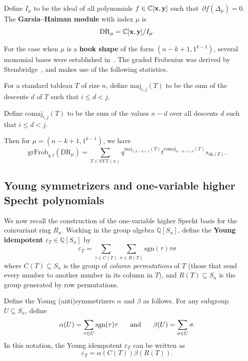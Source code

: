 \documentclass[ALCO,Unicode]{cedram}
\newcommand{\SYT}{\mathrm{SYT}}
\newcommand{\sh}{\mathrm{sh}}
\newcommand{\sgn}{\mathrm{sgn}}
\newcommand{\maj}{\mathrm{maj}}
\newcommand{\comaj}{\mathrm{comaj}}
\newcommand{\DR}{\mathrm{DR}}
\newcommand{\CC}{\mathbb{C}}
\newcommand{\QQ}{\mathbb{Q}}
\newcommand{\grFrob}{\mathrm{grFrob}}
\begin{document}
\begin{definition}
	Define $I_\mu$ to be the ideal of all polynomials $f\in \mathbb{C}[{\bf x},{\bf y}]$ such that~$\partial f(\Delta_\mu)=0$.  The \textbf{Garsia--Haiman module} with index $\mu$ is $$\DR_\mu =\CC[{\bf x},{\bf y}]/I_\mu.$$
\end{definition}

For the case when $\mu$ is a \textbf{hook shape} of the form $(n-k+1,1^{k-1})$, several monomial bases were established in~\cite{HookBases}.  The graded Frobenius was derived by Stembridge~\cite{Stembridge}, and makes use of the following statistics.

\begin{definition}\label{def:maj-comaj}
	For a standard tableau $T$ of size $n$, define $\maj_{i,j}(T)$ to be the sum of the descents $d$ of $T$ such that $i\le d<j$.
	
	Define $\comaj_{i,j}(T)$ to be the sum of the values $n-d$ over all descents $d$ such that $i\le d <j$.
\end{definition}

Then for $\mu=(n-k+1,1^{k-1})$, we have~\cite{Stembridge} 
\begin{equation}\label{eq:stembridge}\grFrob_{q,t}(\DR_\mu)=\sum_{T\in \SYT(n)} q^{\maj_{1,n-k+1}(T)}t^{\comaj_{n-k+1,n}(T)}s_{\sh(T)}.\end{equation}



\subsection{Young symmetrizers and one-variable higher Specht polynomials}

We now recall the construction of the one-variable higher Specht basis for the coinvariant ring $R_n$.  Working in the group algebra $\QQ[S_n]$, define the \textbf{Young idempotent} $\varepsilon_T \in \QQ[S_n]$ by $$\varepsilon_T=\sum_{\tau \in C(T)}\sum_{\sigma \in R(T)}\sgn(\tau) \tau \sigma$$ where $C(T)\subseteq S_n$ is the group of \textit{column permutations}  of $T$ (those that send every number to another number in its column in $T$), and $R(T)\subseteq S_n$ is the group generated by row permutations.

Define the Young (anti)symmetrizers $\alpha$ and $\beta$ as follows.  For any subgroup $U\subseteq S_n$, define $$\alpha(U)=\sum_{\tau \in U}\sgn(\tau)\tau\hspace{0.5cm}\text{ and }  \hspace{0.5cm}\beta(U)=\sum_{\sigma\in U}\sigma.$$  In this notation, the Young idempotent $\varepsilon_T$ can be written as $$\varepsilon_T=\alpha(C(T))\beta(R(T)).$$
\end{document}

